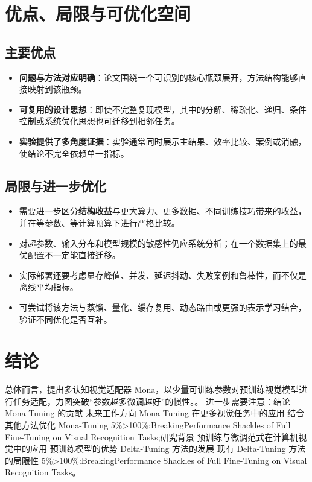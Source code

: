 \documentclass[UTF8,11pt,a4paper]{ctexart}
\newcommand{\term}[1]{\textbf{\textcolor{mainblue}{#1}}}
\begin{document}
\section{优点、局限与可优化空间}
\subsection{主要优点}
\begin{itemize}
\item \term{问题与方法对应明确}：论文围绕一个可识别的核心瓶颈展开，方法结构能够直接映射到该瓶颈。
\item \term{可复用的设计思想}：即使不完整复现模型，其中的分解、稀疏化、递归、条件控制或系统优化思想也可迁移到相邻任务。
\item \term{实验提供了多角度证据}：实验通常同时展示主结果、效率比较、案例或消融，使结论不完全依赖单一指标。
\end{itemize}

\subsection{局限与进一步优化}
\begin{itemize}
\item 需要进一步区分\term{结构收益}与更大算力、更多数据、不同训练技巧带来的收益，并在等参数、等计算预算下进行严格比较。
\item 对超参数、输入分布和模型规模的敏感性仍应系统分析；在一个数据集上的最优配置不一定能直接迁移。
\item 实际部署还要考虑显存峰值、并发、延迟抖动、失败案例和鲁棒性，而不仅是离线平均指标。
\item 可尝试将该方法与蒸馏、量化、缓存复用、动态路由或更强的表示学习结合，验证不同优化是否互补。
\end{itemize}

\section{结论}
总体而言，提出多认知视觉适配器 Mona，以少量可训练参数对预训练视觉模型进行任务适配，力图突破“参数越多微调越好”的惯性。。 进一步需要注意：结论 Mona-Tuning 的贡献 未来工作方向 Mona-Tuning 在更多视觉任务中的应用 结合其他方法优化 Mona-Tuning 5\%>100\%:BreakingPerformance Shackles of Full Fine-Tuning on Visual Recognition Tasks;研究背景 预训练与微调范式在计算机视觉中的应用 预训练模型的优势 Delta-Tuning 方法的发展 现有 Delta-Tuning 方法的局限性 5\%>100\%:BreakingPerformance Shackles of Full Fine-Tuning on Visual Recognition Tasks。
\end{document}
